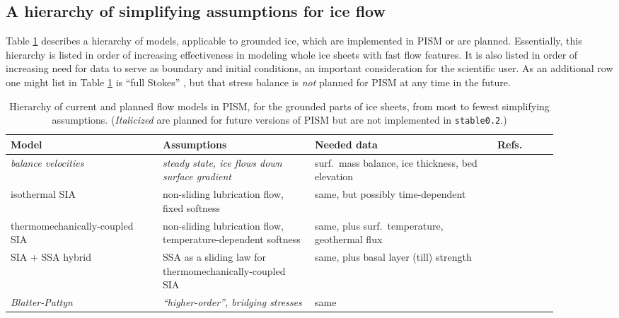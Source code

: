 \documentclass[11pt,final]{amsart}
\begin{document}
\subsection{A hierarchy of simplifying assumptions for ice flow}   Table \ref{tab:modelhierarchy} describes a hierarchy of models, applicable to grounded ice, which are implemented in PISM or are planned.  Essentially, this hierarchy is listed in order of increasing effectiveness in modeling whole ice sheets with fast flow features.  It is also listed in order of increasing need for data to serve as boundary and initial conditions, an important consideration for the scientific user.  As an additional row one might list in Table \ref{tab:modelhierarchy} is ``full Stokes'' \cite{Fowler}, but that stress balance is \emph{not} planned for PISM at any time in the future.

\begin{table}[ht]
\caption{Hierarchy of current and planned flow models in PISM, for the grounded parts of ice sheets, from most to fewest simplifying assumptions.  (\emph{Italicized} are planned for future versions of PISM but are not implemented in \texttt{stable0.2}.)}\label{tab:modelhierarchy} 
\small
\begin{tabular}{p{0.25\linewidth}p{0.25\linewidth}p{0.3\linewidth}p{0.1\linewidth}}\hline
\textbf{Model} & \textbf{Assumptions} & \textbf{Needed data} & \textbf{Refs.} \\ \hline
\emph{balance velocities} & \emph{steady state, ice flows down surface gradient} & surf.~mass balance, ice  thickness, bed elevation& \cite{JoughinetalGrBal97} \\
isothermal SIA & non-sliding lubrication flow, fixed softness & same, but possibly time-dependent & \cite{EISMINT96,BLKCB} \\
thermomechanically-coupled SIA & non-sliding lubrication flow, temperature-dependent softness & same, plus surf.~temperature,  geothermal flux & \cite{BBL} \\
SIA + SSA hybrid & SSA as a sliding law for thermomechanically-coupled SIA  & same, plus basal layer (till) strength & \cite{BBssasliding} \\
\emph{Blatter-Pattyn} & \emph{``higher-order'', bridging stresses} & same & \cite{Blatter,Pattyn03,SchoofCoulombBlatter} \\ \hline
\end{tabular}
\normalsize
\end{table}
\end{document}
